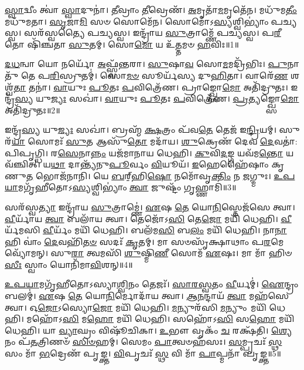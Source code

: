 \setcounter{anuvakam}{0}

\-\ul{𑌸𑍍𑌵𑌾}\-𑌦𑍍𑌵𑍀𑌂 𑌤𑍍𑌵𑌾॑ \ul{𑌸𑍍𑌵𑌾}\-𑌦𑍁𑌨𑌾॑।
\-\ul{𑌤𑍀}\-𑌵𑍍𑌰𑌾𑌂 \ul{𑌤𑍀}\-𑌵𑍍𑌰𑍇𑌣᳴।
\-\ul{𑌅}\-𑌮𑍃𑌤𑌾᳴\-\ul{𑌮}\-𑌮𑍃𑌤𑍇᳴𑌨।
𑌮𑌧𑍁᳴𑌮\-\ul{𑌤𑍀𑌂} 𑌮𑌧𑍁᳴𑌮𑌤𑌾।
\-\ul{𑌸𑍃}\-𑌜𑌾\-\ul{𑌮𑌿} 𑌸𑍞 𑌸𑍋𑌮𑍇᳴𑌨।
𑌸𑍋𑌮𑍋॑\-𑌽\-\ul{𑌸𑍍𑌯}\-𑌶𑍍𑌵𑌿𑌭𑍍𑌯𑌾𑌂॑ 𑌪𑌚𑍍𑌯𑌸𑍍𑌵।
𑌸𑌰᳴𑌸𑍍𑌵𑌤𑍍𑌯𑍈 𑌪𑌚𑍍𑌯𑌸𑍍𑌵।
𑌇𑌨𑍍𑌦𑍍𑌰𑌾᳴𑌯 \ul{𑌸𑍁}\-𑌤𑍍𑌰𑌾𑌮𑍍𑌣𑍇᳴ 𑌪𑌚𑍍𑌯𑌸𑍍𑌵।
𑌪\-\ul{𑌰𑍀}\-𑌤𑍋 𑌷𑌿᳴𑌞𑍍𑌚𑌤𑌾 \ul{𑌸𑍁}\-𑌤𑌮𑍍।
𑌸𑍋\-\ul{𑌮𑍋} 𑌯 𑌉᳴\-\ul{𑌤𑍍𑌤}\-𑌮𑍞 \ul{𑌹}\-𑌵𑌿𑌃॥1॥

\-\ul{𑌦}\-\-\ul{𑌧}\-𑌨𑍍𑌵𑌾 𑌯𑍋 𑌨𑌰𑍍𑌯𑍋᳴ \ul{𑌅}\-𑌫𑍍𑌸𑍍𑌵᳴𑌨𑍍𑌤𑌰𑌾।
\-\ul{𑌸𑍁}\-𑌷𑌾\-\ul{𑌵} 𑌸𑍋\-\ul{𑌮}\-𑌮𑌦𑍍𑌰𑌿᳴𑌭𑌿𑌃।
\-\ul{𑌪𑍁}\-𑌨𑌾𑌤𑍁᳴ 𑌤𑍇 𑌪\-\ul{𑌰𑌿}\-𑌸𑍍𑌰𑍁𑌤𑌮𑍍॑।
𑌸𑍋\-\ul{𑌮}\-\-\ul{𑍞} 𑌸𑍂𑌰𑍍𑌯᳴𑌸𑍍𑌯 𑌦𑍁\-\ul{𑌹𑌿}\-𑌤𑌾।
𑌵𑌾𑌰𑍇᳴\-\ul{𑌣} 𑌶𑌶𑍍𑌵᳴\-\ul{𑌤𑌾} 𑌤𑌨𑌾॑।
\-\ul{𑌵𑌾}\-𑌯𑍁𑌃 \ul{𑌪𑍂}\-𑌤𑌃 \ul{𑌪}\-𑌵𑌿𑌤𑍍𑌰𑍇᳴𑌣।
𑌪𑍍𑌰𑌾𑌙𑍍𑌖𑍍𑌸𑍋\-\ul{𑌮𑍋} 𑌅𑌤𑌿᳴𑌦𑍍𑌰𑍁𑌤𑌃।
𑌇𑌨𑍍𑌦𑍍𑌰᳴\-\ul{𑌸𑍍𑌯} 𑌯𑍁\-\ul{𑌜𑍍𑌯𑌃} 𑌸𑌖𑌾॑।
\-\ul{𑌵𑌾}\-𑌯𑍁𑌃 \ul{𑌪𑍂}\-𑌤𑌃 \ul{𑌪}\-𑌵𑌿𑌤𑍍𑌰𑍇᳴𑌣।
\-\ul{𑌪𑍍𑌰}\-𑌤𑍍𑌯𑌙𑍍𑌖𑍍𑌸𑍋\-\ul{𑌮𑍋} 𑌅𑌤𑌿᳴𑌦𑍍𑌰𑍁𑌤𑌃॥2॥

𑌇𑌨𑍍𑌦𑍍𑌰᳴\-\ul{𑌸𑍍𑌯} 𑌯𑍁\-\ul{𑌜𑍍𑌯𑌃} 𑌸𑌖𑌾॑।
𑌬𑍍𑌰𑌹𑍍𑌮᳴ \ul{𑌕𑍍𑌷}\-𑌤𑍍𑌰𑌂 𑌪᳴𑌵\-\ul{𑌤𑍇} 𑌤𑍇𑌜᳴ 𑌇\-\ul{𑌨𑍍𑌦𑍍𑌰𑌿}\-𑌯𑌮𑍍।
𑌸𑍁𑌰᳴\-\ul{𑌯𑌾} 𑌸𑍋𑌮𑌃᳴ \ul{𑌸𑍁}\-𑌤 𑌆𑌸𑍁᳴\-\ul{𑌤𑍋} 𑌮𑌦𑌾᳴𑌯।
\-\ul{𑌶𑍁}\-𑌕𑍍𑌰𑍇𑌣᳴ 𑌦𑍇𑌵 \ul{𑌦𑍇}\-𑌵𑌤𑌾॑: 𑌪𑌿𑌪𑍃𑌗𑍍𑌧𑌿।
𑌰\-\ul{𑌸𑍇}\-𑌨𑌾\-\ul{𑌨𑍍𑌨𑌂} 𑌯𑌜᳴𑌮𑌾𑌨𑌾𑌯 𑌧𑍇𑌹𑌿।
\-\ul{𑌕𑍁}\-𑌵𑌿\-\ul{𑌦}\-𑌙𑍍𑌗 𑌯𑌵᳴𑌮\-\ul{𑌨𑍍𑌤𑍋} 𑌯𑌵᳴𑌞𑍍𑌚𑌿𑌤𑍍।
𑌯\-\ul{𑌥𑌾} 𑌦𑌾𑌨𑍍𑌤𑍍𑌯᳴𑌨𑍁\-\ul{𑌪𑍂}\-𑌰𑍍𑌵𑌂 \ul{𑌵𑌿}\-𑌯𑍂𑌯᳴।
\-\ul{𑌇}\-𑌹𑍇𑌹𑍈᳴𑌷𑌾𑌂 𑌕𑍃𑌣𑍁\-\ul{𑌤} 𑌭𑍋𑌜᳴𑌨𑌾𑌨𑌿।
𑌯𑍇 \ul{𑌬}\-𑌰𑍍‌॒\mbox{}𑌹𑌿\-\ul{𑌷𑍋} 𑌨𑌮𑍋᳴𑌵𑍃\-\ul{𑌕𑍍𑌤𑌿𑌂} 𑌨 \ul{𑌜}\-𑌗𑍍𑌮𑍁𑌃।
\-\ul{𑌉}\-\-\ul{𑌪}\-\-\ul{𑌯𑌾}\-𑌮𑌗𑍃᳴𑌹𑍀𑌤𑍋\-𑌽\-\ul{𑌸𑍍𑌯}\-𑌶𑍍𑌵𑌿𑌭𑍍𑌯𑌾𑌂॑ \ul{𑌤𑍍𑌵𑌾} 𑌜𑍁𑌷𑍍𑌟𑌂᳴ 𑌗𑍃𑌹𑍍𑌣𑌾𑌮𑌿॥3॥

𑌸𑌰᳴𑌸𑍍𑌵\-\ul{𑌤𑍍𑌯𑌾} 𑌇𑌨𑍍𑌦𑍍𑌰𑌾᳴𑌯 \ul{𑌸𑍁}\-𑌤𑍍𑌰𑌾𑌮𑍍𑌣𑍇॑।
\-\ul{𑌏}\-𑌷 \ul{𑌤𑍇} 𑌯𑍋\-\ul{𑌨𑌿}\-𑌸𑍍𑌤𑍇𑌜᳴𑌸𑍇 𑌤𑍍𑌵𑌾।
\-\ul{𑌵𑍀}\-𑌰𑍍𑌯𑌾᳴𑌯 \ul{𑌤𑍍𑌵𑌾} 𑌬𑌲𑌾᳴𑌯 𑌤𑍍𑌵𑌾।
𑌤𑍇𑌜𑍋᳴𑌽\-\ul{𑌸𑌿} 𑌤𑍇\-\ul{𑌜𑍋} 𑌮𑌯𑌿᳴ 𑌧𑍇𑌹𑌿।
\-\ul{𑌵𑍀}\-𑌰𑍍𑌯᳴𑌮𑌸𑌿 \ul{𑌵𑍀}\-𑌰𑍍𑌯𑌂᳴ 𑌮𑌯𑌿᳴ 𑌧𑍇𑌹𑌿।
𑌬𑌲᳴𑌮\-\ul{𑌸𑌿} 𑌬\-\ul{𑌲𑌂} 𑌮𑌯𑌿᳴ 𑌧𑍇𑌹𑌿।
𑌨𑌾\-\ul{𑌨𑌾} 𑌹𑌿 𑌵𑌾𑌂॑ \ul{𑌦𑍇}\-𑌵𑌹𑌿᳴\-\ul{𑌤}\-\-\ul{𑍞} 𑌸𑌦𑌃᳴ \ul{𑌕𑍃}\-𑌤𑌮𑍍।
𑌮𑌾 𑌸𑍞𑌸𑍃᳴𑌕𑍍𑌷𑌾𑌥𑌾𑌂 𑌪\-\ul{𑌰}\-𑌮𑍇 𑌵𑍍𑌯𑍋᳴𑌮𑌨𑍍।
𑌸𑍁\-\ul{𑌰𑌾} 𑌤𑍍𑌵𑌮𑌸𑌿᳴ \ul{𑌶𑍁}\-𑌷𑍍𑌮𑌿\-\ul{𑌣𑍀} 𑌸𑍋𑌮᳴ \ul{𑌏}\-𑌷𑌃।
𑌮𑌾 𑌮𑌾᳴ 𑌹𑌿𑍞\-\ul{𑌸𑍀𑌃} 𑌸𑍍𑌵𑌾𑌂 𑌯𑍋𑌨𑌿᳴𑌮𑌾\-\ul{𑌵𑌿}\-𑌶𑌨𑍍॥4॥

\-\ul{𑌉}\-\-\ul{𑌪}\-\-\ul{𑌯𑌾}\-𑌮𑌗𑍃᳴𑌹𑍀𑌤𑍋\-𑌽𑌸𑍍𑌯𑌾\-\ul{𑌶𑍍𑌵𑌿}\-𑌨𑌂 𑌤𑍇𑌜𑌃᳴।
\-\ul{𑌸𑌾}\-\-\ul{𑌰}\-\-\ul{𑌸𑍍𑌵}\-𑌤𑌂 \ul{𑌵𑍀}\-𑌰𑍍𑌯𑌮𑍍॑।
\-\ul{𑌐}\-𑌨𑍍𑌦𑍍𑌰𑌂 𑌬𑌲𑌮𑍍॑।
\-\ul{𑌏}\-𑌷 \ul{𑌤𑍇} 𑌯𑍋\-\ul{𑌨𑌿}\-𑌰𑍍𑌮𑍋𑌦𑌾᳴𑌯 𑌤𑍍𑌵𑌾।
\-\ul{𑌆}\-\-\ul{𑌨}\-𑌨𑍍𑌦𑌾𑌯᳴ \ul{𑌤𑍍𑌵𑌾} 𑌮𑌹᳴𑌸𑍇 𑌤𑍍𑌵𑌾।
𑌓\-\ul{𑌜𑍋}\-𑌽𑌸𑍍𑌯𑍋\-\ul{𑌜𑍋} 𑌮𑌯𑌿᳴ 𑌧𑍇𑌹𑌿।
\-\ul{𑌮}\-𑌨𑍍𑌯𑍁𑌰᳴𑌸𑌿 \ul{𑌮}\-𑌨𑍍𑌯𑍁𑌂 𑌮𑌯𑌿᳴ 𑌧𑍇𑌹𑌿।
𑌮𑌹𑍋᳴𑌽\-\ul{𑌸𑌿} 𑌮\-\ul{𑌹𑍋} 𑌮𑌯𑌿᳴ 𑌧𑍇𑌹𑌿।
𑌸𑌹𑍋᳴𑌽\-\ul{𑌸𑌿} 𑌸\-\ul{𑌹𑍋} 𑌮𑌯𑌿᳴ 𑌧𑍇𑌹𑌿।
𑌯𑌾 \ul{𑌵𑍍𑌯𑌾}\-𑌘𑍍𑌰𑌂 𑌵𑌿𑌷𑍂᳴𑌚𑌿𑌕𑌾।
\-\ul{𑌉}\-𑌭𑍗 𑌵𑍃𑌕𑌂᳴ \ul{𑌚} 𑌰𑌕𑍍𑌷᳴𑌤𑌿।
\-\ul{𑌶𑍍𑌯𑍇}\-𑌨𑌂 𑌪᳴\-\ul{𑌤}\-𑌤𑍍𑌰𑌿𑌣𑍞᳴ \ul{𑌸𑌿}\-\-\ul{𑍞}\-𑌹𑌮𑍍।
𑌸𑍇𑌮𑌂 \ul{𑌪𑌾}\-𑌤𑍍𑌵𑍞𑌹᳴𑌸𑌃।
\-\ul{𑌸}\-𑌮𑍍𑌪𑍃𑌚𑌃᳴ \ul{𑌸𑍍𑌥} 𑌸𑌂 𑌮𑌾᳴ \ul{𑌭}\-𑌦𑍍𑌰𑍇𑌣᳴ 𑌪𑍃𑌙𑍍𑌕𑍍𑌤।
\-\ul{𑌵𑌿}\-𑌪𑍃𑌚𑌃᳴ \ul{𑌸𑍍𑌥} 𑌵𑌿 𑌮𑌾᳴ \ul{𑌪𑌾}\-𑌪𑍍𑌮𑌨𑌾᳴ 𑌪𑍃𑌙𑍍𑌕𑍍𑌤॥5॥\anuvakamend[\-\ul{𑌹}\-𑌵𑌿𑌃 \ul{𑌪𑍍𑌰}\-𑌤𑍍𑌯𑌙𑍍𑌖𑍍𑌸𑍋\-\ul{𑌮𑍋} 𑌅𑌤𑌿᳴𑌦𑍍𑌰𑍁𑌤𑍋 𑌗𑍃𑌹𑍍𑌣𑌾𑌮𑍍𑌯𑌾\-\ul{𑌵𑌿}\-𑌶𑌨𑍍𑌵𑌿𑌷𑍂᳴𑌚𑌿\-\ul{𑌕𑌾} 𑌪𑌞𑍍𑌚᳴ 𑌚]

